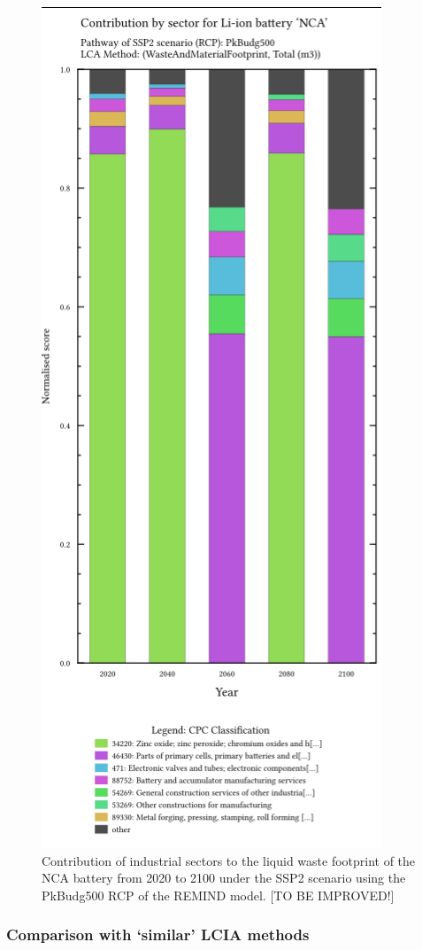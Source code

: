 \begin{figure}[H]
    \centering
    \includegraphics[width=0.6\linewidth]{figures/cpc_contribution.png
    }
    \caption{Contribution of industrial sectors to the liquid waste footprint of the NCA battery from 2020 to 2100 under the SSP2 scenario using the PkBudg500 RCP of the REMIND model. [TO BE IMPROVED!]}\label{fig:cpc_contribution}
\end{figure}


\subsubsection{Comparison with `similar' LCIA methods}\label{sec:results-case_study-methodcomparison}

